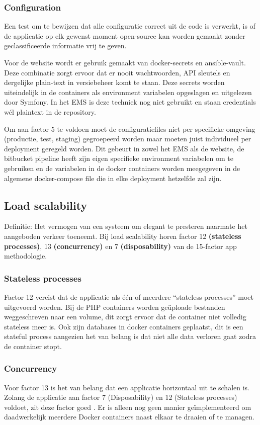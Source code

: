 \subsubsection{Configuration}
Een test om te bewijzen dat alle configuratie correct uit de code is verwerkt, is of de applicatie op elk gewenst moment open-source kan worden gemaakt zonder geclassificeerde informatie vrij te geven.

Voor de website wordt er gebruik gemaakt van docker-secrets en ansible-vault. Deze combinatie zorgt ervoor dat er nooit wachtwoorden, API sleutels en dergelijke plain-text in versiebeheer komt te staan. Deze secrets worden uiteindelijk in de containers als environment variabelen opgeslagen en uitgelezen door Symfony. In het EMS is deze techniek nog niet gebruikt en staan credentials wél plaintext in de repository.

Om aan factor 5 te voldoen moet de configuratiefiles niet per specifieke omgeving (productie, test, staging) gegroepeerd worden maar moeten juist individueel per deployment geregeld worden. Dit gebeurt in zowel het EMS als de website, de bitbucket pipeline heeft zijn eigen specifieke environment variabelen om te gebruiken en de variabelen in de docker containers worden meegegeven in de algemene docker-compose file die in elke deployment hetzelfde zal zijn.

\subsection{Load scalability}
Definitie: Het vermogen van een systeem om elegant te presteren naarmate het aangeboden verkeer toeneemt. Bij load scalability horen factor 12 \textbf{(stateless processes)}, 13 \textbf{(concurrency)} en 7 \textbf{(disposability)} van de 15-factor app methodologie. 

\subsubsection{Stateless processes}
Factor 12 vereist dat de applicatie als één of meerdere \enquote{stateless processes} moet uitgevoerd worden. Bij de PHP containers worden geüploade bestanden weggeschreven naar een volume, dit zorgt ervoor dat de container niet volledig stateless meer is. Ook zijn databases in docker containers geplaatst, dit is een stateful process aangezien het van belang is dat niet alle data verloren gaat zodra de container stopt.

\subsubsection{Concurrency}
Voor factor 13 is het van belang dat een applicatie horizontaal uit te schalen is. Zolang de applicatie aan factor 7 (Disposability) en 12 (Stateless processes) voldoet, zit deze factor goed \parencite{Beyond12Factor}. Er is alleen nog geen manier geïmplementeerd om daadwerkelijk meerdere Docker containers naast elkaar te draaien of te managen.

